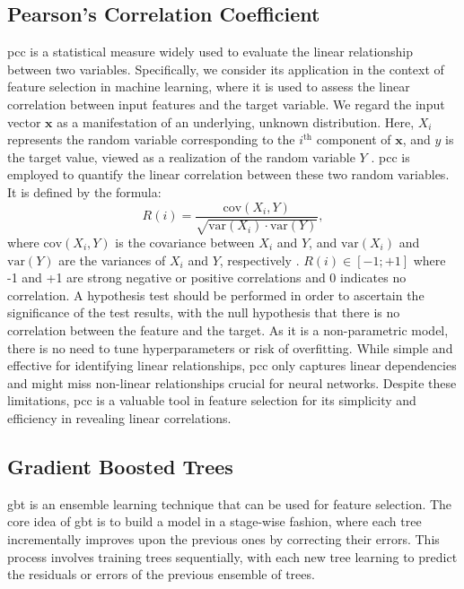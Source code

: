 \documentclass[12pt, a4paper, headinclude, twoside, plainheadsepline, open=right, numbers=noenddot, hidelinks, toc=listof, toc=bibliography]{scrreprt}
\begin{document}
\subsection*{Pearson's Correlation Coefficient}
\label{ssec:pearsons}
\Ac{pcc} is a statistical measure widely used to evaluate the linear relationship between two variables. 
Specifically, we consider its application in the context of feature selection in machine learning, where it is used to assess the linear correlation between input features and the target variable. 
We regard the input vector $\mathbf{x}$ as a manifestation of an underlying, unknown distribution. 
Here, $X_i$ represents the random variable corresponding to the $i^{\text{th}}$ component of $\mathbf{x}$, and $y$ is the target value, viewed as a realization of the random variable $Y$ \cite{guyonIntroductionVariableFeature2003}. 
\Ac{pcc} is employed to quantify the linear correlation between these two random variables. It is defined by the formula:
\begin{equation}
R(i) = \frac{\text{cov}(X_i, Y)}{\sqrt{\text{var}(X_i) \cdot \text{var}(Y)}},
\end{equation}
where $\text{cov}(X_i, Y)$ is the covariance between $X_i$ and $Y$, and $\text{var}(X_i)$ and $\text{var}(Y)$ are the variances of $X_i$ and $Y$, respectively \cite{chandrashekarSurveyFeatureSelection2014}.
$R(i) \in [-1; +1]$ where -1 and +1 are strong negative or positive correlations and 0 indicates no correlation. 
A hypothesis test should be performed in order to ascertain the significance of the test results, with the null hypothesis that there is no correlation between the feature and the target.
As it is a non-parametric model, there is no need to tune hyperparameters or risk of overfitting.
While simple and effective for identifying linear relationships, \ac{pcc} only captures linear dependencies and might miss non-linear relationships crucial for neural networks.
Despite these limitations, \ac{pcc} is a valuable tool in feature selection for its simplicity and efficiency in revealing linear correlations.

\subsection*{Gradient Boosted Trees}
\label{ssec:gbt}

\Acf{gbt} \cite{friedmanGreedyFunctionApproximation2001} is an ensemble learning technique that can be used for feature selection. 
The core idea of \ac{gbt} is to build a model in a stage-wise fashion, where each tree incrementally improves upon the previous ones by correcting their errors. 
This process involves training trees sequentially, with each new tree learning to predict the residuals or errors of the previous ensemble of trees.
\end{document}
